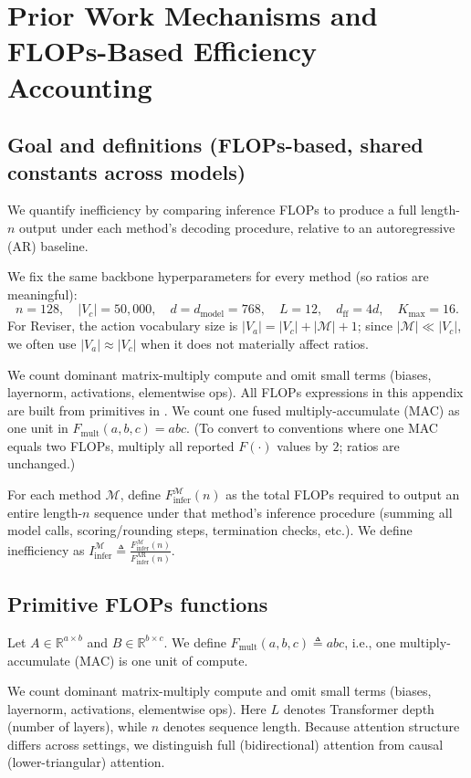 \documentclass[11pt]{article}
\newcommand{\Mset}{\mathcal{M}}
\begin{document}
\section{Prior Work Mechanisms and FLOPs-Based Efficiency Accounting}
\label{app:prior_art_efficiency_flops}

\subsection{Goal and definitions (FLOPs-based, shared constants across models)}
We quantify inefficiency by comparing inference FLOPs to produce a full length-$n$ output under each method's decoding procedure, relative to an autoregressive (AR) baseline.

We fix the same backbone hyperparameters for every method (so ratios are meaningful):
\[
n=128,\quad |V_c|=50{,}000,\quad d=d_{\text{model}}=768,\quad L=12,\quad d_{\text{ff}}=4d,\quad K_{\max}=16.
\]
For Reviser, the action vocabulary size is $|V_a| = |V_c| + |\Mset| + 1$; since $|\Mset|\ll |V_c|$, we often use $|V_a| \approx |V_c|$ when it does not materially affect ratios.

We count dominant matrix-multiply compute and omit small terms (biases, layernorm, activations, elementwise ops).
All FLOPs expressions in this appendix are built from primitives in .
We count one fused multiply-accumulate (MAC) as one unit in $F_{\text{mult}}(a,b,c)=abc$.
(To convert to conventions where one MAC equals two FLOPs, multiply all reported $F(\cdot)$ values by $2$; ratios are unchanged.)

For each method $\mathcal{M}$, define $F_{\text{infer}}^{\mathcal{M}}(n)$ as the total FLOPs required to output an entire length-$n$
sequence under that method's inference procedure (summing all model calls, scoring/rounding steps, termination checks, etc.).
We define inefficiency as $I_{\text{infer}}^{\mathcal{M}} \triangleq \frac{F_{\text{infer}}^{\mathcal{M}}(n)}{F_{\text{infer}}^{\text{AR}}(n)}$.

\subsection{Primitive FLOPs functions}
\label{app:flops_primitives}

Let $A\in\mathbb{R}^{a\times b}$ and $B\in\mathbb{R}^{b\times c}$. We define
$F_{\text{mult}}(a,b,c) \triangleq abc$, i.e., one multiply-accumulate (MAC) is one unit of compute.

We count dominant matrix-multiply compute and omit small terms (biases, layernorm, activations, elementwise ops). Here $L$ denotes Transformer depth (number of layers), while $n$ denotes sequence length. Because attention structure differs across settings, we distinguish full (bidirectional) attention from causal
(lower-triangular) attention.
\end{document}
